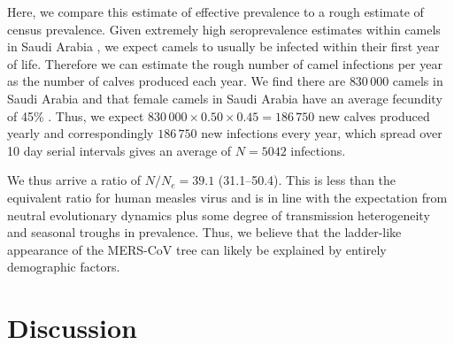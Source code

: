 \documentclass[11pt,oneside,letterpaper]{article}
\begin{document}
Here, we compare this estimate of effective prevalence to a rough estimate of census prevalence.
Given extremely high seroprevalence estimates within camels in Saudi Arabia \citep{muller_2014,corman_antibodies_2014,chu_2014,reusken_2013,reusken_2014}, we expect camels to usually be infected within their first year of life.
Therefore we can estimate the rough number of camel infections per year as the number of calves produced each year.
We find there are $830\,000$ camels in Saudi Arabia \citep{abdallah_camel_farming_2013} and that female camels in Saudi Arabia have an average fecundity of 45\% \citep{abdallah_camel_farming_2013}.
Thus, we expect $830\,000 \times 0.50 \times 0.45 = 186\,750$ new calves produced yearly and correspondingly $186\,750$ new infections every year, which spread over 10 day serial intervals gives an average of $N = 5042$ infections.

We thus arrive a ratio of $N/N_e = 39.1$ (31.1--50.4).
This is less than the equivalent ratio for human measles virus \citep{bedford_strength_2011} and is in line with the expectation from neutral evolutionary dynamics plus some degree of transmission heterogeneity \citep{volz_phylodynamics_2013} and seasonal troughs in prevalence.
Thus, we believe that the ladder-like appearance of the MERS-CoV tree can likely be explained by entirely demographic factors.


\section*{Discussion}
\end{document}

